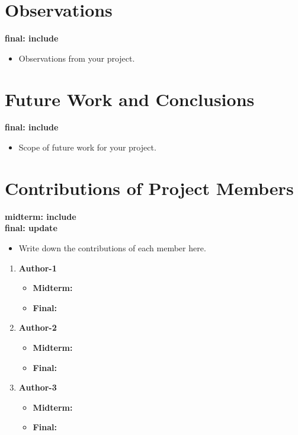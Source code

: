 \documentclass[twocolumn]{article}
\newcommand{\red}[1]{{\bf \color{red}#1}}
\newcommand{\blue}[1]{{\bf \color{blue}#1}}
\begin{document}
\section{Observations}
\blue{
final: include\\
}

\red{
\begin{itemize}
\itemsep0em
\item Observations from your project.
\end{itemize}
}


\section{Future Work and Conclusions}
\blue{
final: include\\
}

\red{
\begin{itemize}
\itemsep0em
\item Scope of future work for your project.
\end{itemize}
}


\section{Contributions of Project Members}
\blue{
midterm: include\\
final: update\\
}

\red{
\begin{itemize}
\itemsep0em
\item Write down the contributions of each member here.
\end{itemize}
}


\begin{enumerate}
\item {\bf Author-1}
\begin{itemize}
\item {\bf Midterm:}
\item {\bf Final:}
\end{itemize}
\item {\bf Author-2}
\begin{itemize}
\item {\bf Midterm:}
\item {\bf Final:}
\end{itemize}
\item {\bf Author-3}
\begin{itemize}
\item {\bf Midterm:}
\item {\bf Final:}
\end{itemize}
\end{enumerate}



\end{document}
